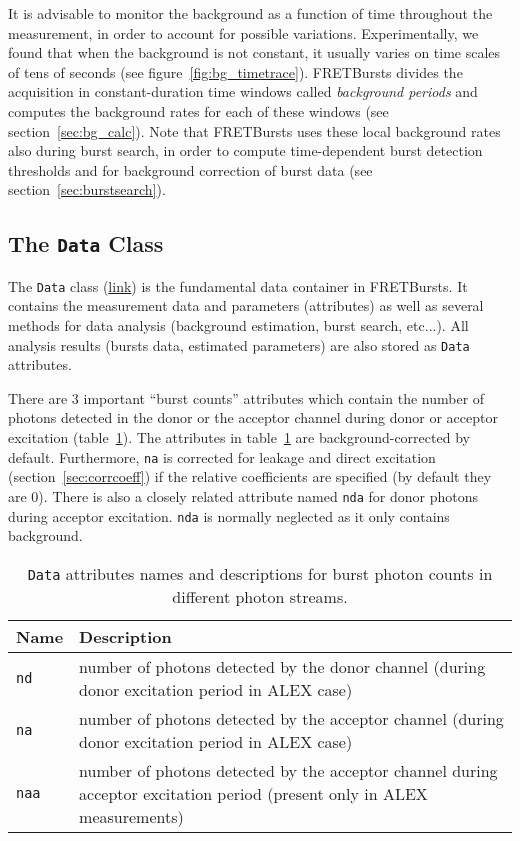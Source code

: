It is advisable to monitor the background as a function of time
throughout the measurement, in order to account for possible variations.
Experimentally, we found that when the background is not constant,
it usually varies
on time scales of tens of seconds (see figure~\ref{fig:bg_timetrace}).
FRETBursts divides the acquisition in constant-duration time
windows called \textit{background periods} and computes the background rates for
each of these windows (see section~\ref{sec:bg_calc}).
Note that FRETBursts uses these local background rates also during burst search, 
in order to compute time-dependent burst detection thresholds 
and for background correction of burst data (see section~\ref{sec:burstsearch}).

\subsection{The \texttt{Data} Class}
\label{sec:data_intro}

The \verb|Data| class
(\href{http://fretbursts.readthedocs.org/en/latest/data_class.html}{link})
is the fundamental data container in FRETBursts. It contains the
measurement data and parameters (attributes) as well as several methods
for data analysis (background estimation, burst search, etc...).
All analysis results (bursts data, estimated parameters) are also stored
as \verb|Data| attributes.

There are 3 important ``burst counts'' attributes which contain
the number of photons detected in the donor or the acceptor channel
during donor or acceptor excitation (table~\ref{tab:data_n}).
The attributes in table~\ref{tab:data_n} are background-corrected by default.
Furthermore, \verb|na| is corrected for leakage and direct excitation
(section~\ref{sec:corrcoeff}) if the relative coefficients are specified
(by default they are 0).
There is also a closely related attribute named \verb|nda| for donor photons
during acceptor excitation. \verb|nda| is normally neglected as it only contains
background.

\begin{table}
\begin{tabular}{l p{}}
  Name  & Description \\
  \hline
  \verb|nd| & number of photons detected by the donor channel (during donor excitation period in ALEX case)\\
  \verb|na| & number of photons detected by the acceptor channel (during donor excitation period in ALEX case)\\
  \verb|naa| & number of photons detected by the acceptor channel during acceptor excitation period (present only in ALEX measurements)\\
\end{tabular}
\caption{\label{tab:data_n}\texttt{Data} attributes names and descriptions for burst photon counts in different photon streams.}
\end{table}


